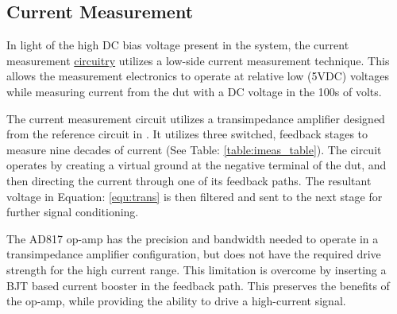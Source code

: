 \subsection{Current Measurement}
\label{sec:iMeas}

In light of the high DC bias voltage present in the system, the current measurement \hyperlink{sch:discharging}{circuitry} utilizes a low-side current measurement technique. This allows the measurement electronics to operate at relative low (5VDC) voltages while measuring current from the \gls{dut} with a DC voltage in the 100s of volts.



The current measurement circuit utilizes a transimpedance amplifier designed from the reference circuit in \cite{steve_thesis}. It utilizes three switched, feedback stages to measure nine decades of current (See Table: \ref{table:imeas_table}). The circuit operates by creating a virtual ground at the negative terminal of the \gls{dut}, and then directing the current through one of its feedback paths. The resultant voltage in Equation: \eqref{equ:trans} is then filtered and sent to the next stage for further signal conditioning.


The AD817 op-amp has the precision and bandwidth needed to operate in a transimpedance amplifier configuration, but does not have the required drive strength for the  high current range. This limitation is overcome by inserting a BJT based current booster in the feedback path. This preserves the benefits of the op-amp, while providing the ability to drive a high-current signal.

